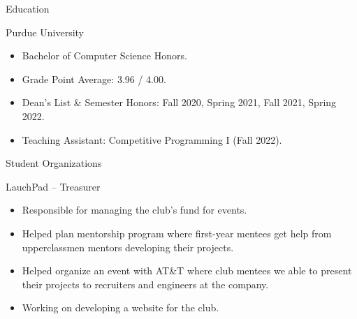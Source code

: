 \documentclass[]{article}
\newlength{\tabin}
\newlength{\secsep}
\newcommand{\lineunder}{\vspace*{-8pt} \\ \hspace*{-6pt} \hrulefill \\ \vspace*{-15pt}}
\newenvironment{tabbedsection}[1]{
  \begin{list}{}{
      \setlength{\itemsep}{0pt}
      \setlength{\labelsep}{0pt}
      \setlength{\labelwidth}{0pt}
      \setlength{\leftmargin}{\tabin}
      \setlength{\rightmargin}{\tabin}
      \setlength{\listparindent}{0pt}
      \setlength{\parsep}{0pt}
      \setlength{\parskip}{0pt}
      \setlength{\partopsep}{0pt}
      \setlength{\topsep}{#1}
    }
  \item[]
}{\end{list}}
\newenvironment{resume_section}[1]{
  \filbreak
  \vspace{2\secsep}
  \textsc{\large#1}
  \lineunder
  \begin{tabbedsection}{\secsep}
}{\end{tabbedsection}}
\newenvironment{resume_subsection}[2][]{
  \textbf{#2} \hfill {\footnotesize #1} \hspace{2em}
  \begin{tabbedsection}{0.5\secsep}
}{\end{tabbedsection}}
\newenvironment{subitems}{
  \renewcommand{\labelitemi}{-}
  \begin{itemize}
      \setlength{\labelsep}{1em}
}{\end{itemize}}
\begin{document}

\begin{resume_section}{Education}

	\begin{resume_subsection}{Purdue University}

		\begin{subitems}

			\item Bachelor of Computer Science Honors.

			\item Grade Point Average: 3.96 / 4.00.

			\item Dean's List \& Semester Honors: Fall 2020, Spring 2021, Fall 2021, Spring 2022.

			\item Teaching Assistant: Competitive Programming I (Fall 2022).

		\end{subitems}

	\end{resume_subsection}

\end{resume_section}


\begin{resume_section}{Student Organizations}

	\begin{resume_subsection}{LauchPad -- Treasurer}

		\begin{subitems}

			\item Responsible for managing the club's fund for events.

			\item Helped plan mentorship program where first-year mentees get help from
			upperclassmen mentors developing their projects.

			\item Helped organize an event with AT\&T where club mentees we able to present their
			projects to recruiters and engineers at the company.

			\item Working on developing a website for the club.

		\end{subitems}

	\end{resume_subsection}

\end{resume_section}
\end{document}
